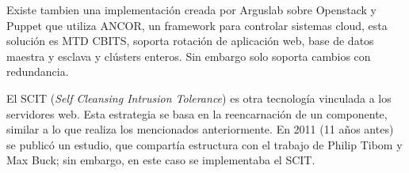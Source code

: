 Existe tambien una implementación creada por Arguslab\cite{arguslab} sobre Openstack\cite{openstack} y Puppet\cite{puppet} que utiliza ANCOR, un framework para controlar sistemas cloud, esta solución es MTD CBITS\cite{ancor}, soporta rotación de aplicación web, base de datos maestra y esclava y clústers enteros. Sin embargo solo soporta cambios con redundancia.

El SCIT (\textit{Self Cleansing Intrusion Tolerance})\cite{SCIT-base} es otra tecnología vinculada a los servidores web. Esta estrategia se basa en la reencarnación de un componente, similar a lo que realiza los mencionados anteriormente. En 2011 (11 años antes) se publicó un estudio\cite{SCIT-cloud}, que compartía estructura con el trabajo de Philip Tibom y Max Buck; sin embargo, en este caso se implementaba el SCIT. 


